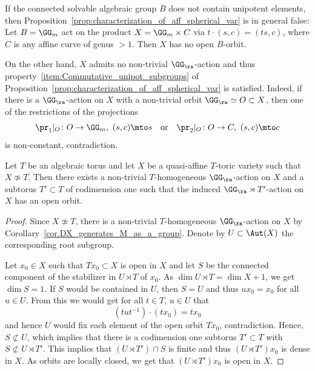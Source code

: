 \begin{example}
If the connected solvable algebraic group $B$ does not contain unipotent elements, then
Proposition~\ref{prop:characterization_of_aff_spherical_var} is in general false: Let
$B = \GG_m$ act on the product $X = \GG_m \times C$ via $t \cdot (s, c) = (ts, c)$, where $C$
is any affine curve of genus $> 1$. Then $X$ has no open $B$-orbit.

On the other hand,
$X$ admits no non-trivial $\GG_\ra$-action and thus
property~\eqref{item:Commutative_unipot_subgroups} of
Proposition~\ref{prop:characterization_of_aff_spherical_var} is satisfied.
Indeed, if there is a $\GG_\ra$-action on $X$ with a non-trivial orbit $\GG_\ra \simeq O \subset X$, then one of the restrictions
of the projections
\[
\pr_1 |_O \colon O \to \GG_m, \ (s, c) \mto s \quad \textrm{or} \quad
\pr_2 |_O \colon O \to C, \ (s, c) \mto c
\]
is non-constant, contradiction.
\end{example}

\begin{lemma}
\label{lem.open_orbit_of_solvable_group}
Let $T$ be an algebraic torus and let $X$ be a quasi-affine
$T$-toric variety such that $X \not\simeq T$.
Then there exists a non-trivial $T$-homogeneous $\GG_\ra$-action on $X$ and a
subtorus $T' \subset T$ of codimension one such that the induced
$\GG_\ra \rtimes T'$-action on $X$ has an open orbit.
\end{lemma}

\begin{proof}
Since $X \not\simeq T$,
there is a non-trivial $T$-homogeneous $\GG_\ra$-action on $X$
by Corollary~\ref{cor.DX_generates_M_as_a_group}. Denote by
$U \subset \Aut(X)$ the corresponding
root subgroup.

Let $x_0 \in X$ such that $T x_0 \subset X$ is open in $X$ and let
$S$ be the connected component of the stabilizer in $U \rtimes T$ of $x_0$.
As $\dim U \rtimes T = \dim X + 1$, we get $\dim S = 1$.
If $S$ would be contained in $U$,
then $S = U$ and thus
$u x_0 = x_0$ for all $u \in U$. From this we would get for all $t \in T$, $u \in U$ that
\[
(t u t^{-1}) \cdot (t x_0) = t x_0
\]
and hence $U$ would fix each element of the open orbit $T x_0$, contradiction.
Hence, \hbox{$S \!\not\subset\!U$}, which implies that there is a codimension one
subtorus $T' \subset T$ with $S \not\subset U \rtimes T'$. This implies that
$(U \rtimes T') \cap S$ is finite
and thus $(U \rtimes T') x_0$ is dense in $X$. As orbits are locally closed, we get that
$(U \rtimes T') x_0$ is open in $X$.
\end{proof}

